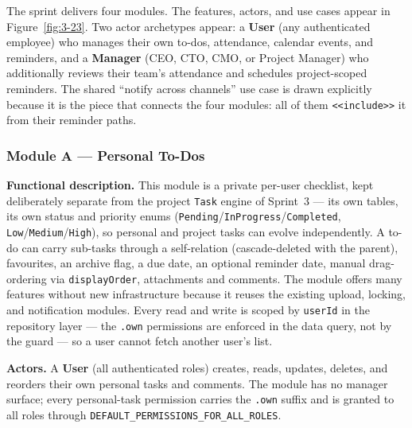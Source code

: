 The sprint delivers four modules. The features, actors, and use cases appear in
Figure~\ref{fig:3-23}. Two actor archetypes appear: a \textbf{User} (any authenticated employee)
who manages their own to-dos, attendance, calendar events, and reminders, and a
\textbf{Manager} (CEO, CTO, CMO, or Project Manager) who additionally reviews their team's
attendance and schedules project-scoped reminders. The shared ``notify across channels'' use
case is drawn explicitly because it is the piece that connects the four modules: all of them
\texttt{<<include>>} it from their reminder paths.

{\renewcommand{\figmaxheight}{0.75\textheight}%
}

\subsubsection{Module A --- Personal To-Dos}

\textbf{Functional description.} This module is a private per-user checklist, kept deliberately
separate from the project \texttt{Task} engine of Sprint~3 --- its own tables, its own status and
priority enums (\texttt{Pending}/\texttt{InProgress}/\texttt{Completed},
\texttt{Low}/\texttt{Medium}/\texttt{High}), so personal and project tasks can evolve independently. A
to-do can carry sub-tasks through a self-relation (cascade-deleted with the parent), favourites,
an archive flag, a due date, an optional reminder date, manual drag-ordering via
\texttt{displayOrder}, attachments and comments. The module offers many features without new
infrastructure because it reuses the existing upload, locking, and notification modules. Every
read and write is scoped by \texttt{userId} in the repository layer --- the \texttt{.own} permissions
are enforced in the data query, not by the guard --- so a user cannot fetch another user's list.

\textbf{Actors.} A \textbf{User} (all authenticated roles) creates, reads, updates, deletes, and
reorders their own personal tasks and comments. The module has no manager surface; every
personal-task permission carries the \texttt{.own} suffix and is granted to all roles through
\texttt{DEFAULT\_PERMISSIONS\_FOR\_ALL\_ROLES}.

